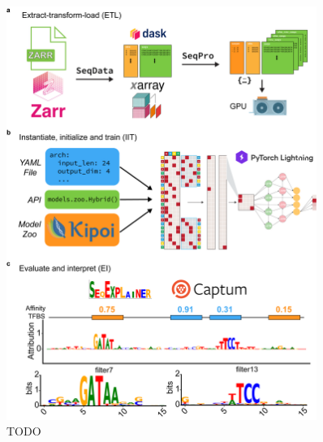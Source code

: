 \begin{figure}[p]
    \centering
    \includegraphics[width=0.9\textwidth, height=0.745\textheight]{1_figures-and-files/figure1.png}
    \caption[TODO]{TODO  
    }
    \label{fig:1 EUGENe Overview}
\end{figure}


